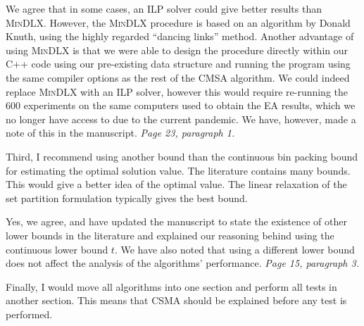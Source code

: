 \documentclass[a4paper,11pt]{article}
\newcommand{\heur}[1]{{\color{myPink}#1}}
\newcommand{\other}[1]{{\color{myPurple1}#1}}
\newcommand{\resp}[1]{{\color{myDarkBlue2}#1}} %
\begin{document}
\resp{We agree that in some cases, an ILP solver could give better results than \textsc{MinDLX}. However, the \textsc{MinDLX} procedure is based on an algorithm by Donald Knuth, using the highly regarded ``dancing links'' method. Another advantage of using \textsc{MinDLX} is that we were able to design the procedure directly within our C++ code using our pre-existing data structure and running the program using the same compiler options as the rest of the CMSA algorithm. We could indeed replace \textsc{MinDLX} with an ILP solver, however this would require re-running the 600 experiments on the same computers used to obtain the EA results, which we no longer have access to due to the current pandemic. We have, however, made a note of this in the manuscript. \textit{Page 23, paragraph 1.}}


Third, I recommend using another bound than the continuous bin packing bound for estimating the optimal solution value. The literature contains many bounds. This would give a better idea of the optimal value. The linear relaxation of the set partition formulation typically gives the best bound. 


\resp{Yes, we agree, and have updated the manuscript to state the existence of other lower bounds in the literature and explained our reasoning behind using the continuous lower bound $t$. We have also noted that using a different lower bound does not affect the analysis of the algorithms' performance. \textit{Page 15, paragraph 3.}}

Finally, I would move all algorithms into one section and perform all tests in another section. This means that CSMA should be explained before any test is performed. 

\end{document}
